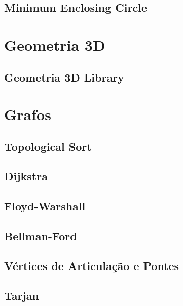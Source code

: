 \subsection{Minimum Enclosing Circle}
\raggedbottom
\hrulefill

\section{Geometria 3D}
\subsection{Geometria 3D Library}
\raggedbottom
\hrulefill

\section{Grafos}
\subsection{Topological Sort}
\raggedbottom
\hrulefill
\subsection{Dijkstra}
\raggedbottom
\hrulefill
\subsection{Floyd-Warshall}
\raggedbottom
\hrulefill
\subsection{Bellman-Ford}
\raggedbottom
\hrulefill
\subsection{Vértices de Articulação e Pontes}
\raggedbottom
\hrulefill
\subsection{Tarjan}
\raggedbottom
\hrulefill
